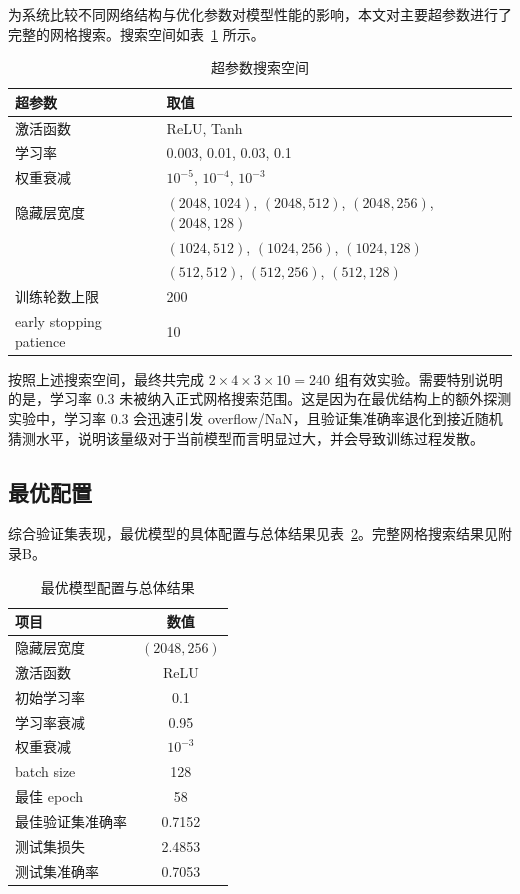 \documentclass[UTF8,a4paper,11pt]{ctexart}
\begin{document}
为系统比较不同网络结构与优化参数对模型性能的影响，本文对主要超参数进行了完整的网格搜索。搜索空间如表~\ref{tab:grid-search} 所示。

\begin{table}[H]
    \centering
    \caption{超参数搜索空间}
    \label{tab:grid-search}
    \begin{tabular}{ll}
        \toprule
        超参数 & 取值 \\
        \midrule
        激活函数 & ReLU, Tanh \\
        学习率 & 0.003, 0.01, 0.03, 0.1 \\
        权重衰减 & $10^{-5}$, $10^{-4}$, $10^{-3}$ \\
        隐藏层宽度 & $(2048,1024)$, $(2048,512)$, $(2048,256)$, $(2048,128)$ \\
        & $(1024,512)$, $(1024,256)$, $(1024,128)$ \\
        & $(512,512)$, $(512,256)$, $(512,128)$ \\
        训练轮数上限 & 200 \\
        early stopping patience & 10 \\
        \bottomrule
    \end{tabular}
\end{table}

按照上述搜索空间，最终共完成 $2 \times 4 \times 3 \times 10 = 240$ 组有效实验。需要特别说明的是，学习率 $0.3$ 未被纳入正式网格搜索范围。这是因为在最优结构上的额外探测实验中，学习率 $0.3$ 会迅速引发 overflow/NaN，且验证集准确率退化到接近随机猜测水平，说明该量级对于当前模型而言明显过大，并会导致训练过程发散。

\subsection{最优配置}

综合验证集表现，最优模型的具体配置与总体结果见表~\ref{tab:best-config}。完整网格搜索结果见附录B。

\begin{table}[H]
    \centering
    \caption{最优模型配置与总体结果}
    \label{tab:best-config}
    \begin{tabular}{lc}
        \toprule
        项目 & 数值 \\
        \midrule
        隐藏层宽度 & $(2048, 256)$ \\
        激活函数 & ReLU \\
        初始学习率 & 0.1 \\
        学习率衰减 & 0.95 \\
        权重衰减 & $10^{-3}$ \\
        batch size & 128 \\
        最佳 epoch & 58 \\
        最佳验证集准确率 & 0.7152 \\
        测试集损失 & 2.4853 \\
        测试集准确率 & 0.7053 \\
        \bottomrule
    \end{tabular}
\end{table}
\end{document}
